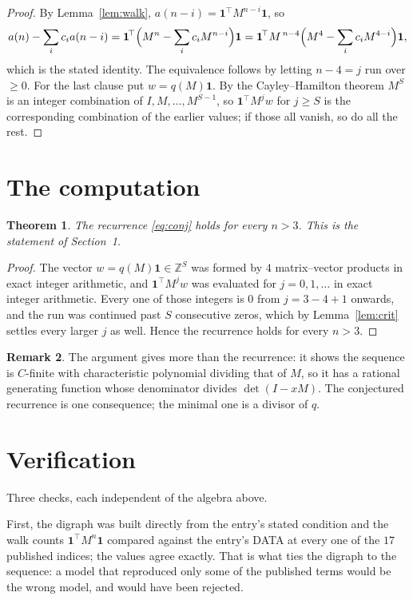\documentclass[11pt,a4paper]{article}
\theoremstyle{plain}
\newtheorem{theorem}{Theorem}
\theoremstyle{definition}
\newtheorem{remark}[theorem]{Remark}
\begin{document}
\begin{proof}
By Lemma~\ref{lem:walk}, $a(n-i)=\mathbf{1}^{\!\top}M^{n-i}\mathbf{1}$, so
\[
a(n)-\sum_i c_i a(n-i)
=\mathbf{1}^{\!\top}\Bigl(M^{n}-\sum_i c_i M^{n-i}\Bigr)\mathbf{1}
=\mathbf{1}^{\!\top}M^{\,n-4}\Bigl(M^{4}-\sum_i c_i M^{4-i}\Bigr)\mathbf{1},
\]
which is the stated identity. The equivalence follows by letting $n-4=j$ run over
$\ge0$. For the last clause put $w=q(M)\mathbf{1}$. By the Cayley--Hamilton theorem
$M^{S}$ is an integer combination of $I,M,\dots,M^{S-1}$, so
$\mathbf{1}^{\!\top}M^{j}w$ for $j\ge S$ is the corresponding combination of the
earlier values; if those all vanish, so do all the rest.
\end{proof}

\section{The computation}

\begin{theorem}
The recurrence \eqref{eq:conj} holds for every $n>3$. This is the statement of
Section~1.
\end{theorem}

\begin{proof}
The vector $w=q(M)\mathbf{1}\in\mathbb{Z}^{S}$ was formed by $4$ matrix--vector
products in exact integer arithmetic, and $\mathbf{1}^{\!\top}M^{j}w$ was evaluated for
$j=0,1,\dots$ in exact integer arithmetic. Every one of those integers is $0$ from
$j=3-4+1$ onwards, and the run was continued past $S$ consecutive zeros, which by
Lemma~\ref{lem:crit} settles every larger $j$ as well. Hence the recurrence holds for
every $n>3$.
\end{proof}

\begin{remark}
The argument gives more than the recurrence: it shows the sequence is $C$-finite with
characteristic polynomial dividing that of $M$, so it has a rational generating function
whose denominator divides $\det(I-xM)$. The conjectured recurrence is one consequence; the
minimal one is a divisor of $q$.
\end{remark}

\section{Verification}

Three checks, each independent of the algebra above.

First, the digraph was built directly from the entry's stated condition and the walk counts
$\mathbf{1}^{\!\top}M^{n}\mathbf{1}$ compared against the entry's DATA at every one of
the $17$ published indices; the values agree exactly. That is what ties the digraph to
the sequence: a model that reproduced only some of the published terms would be the wrong
model, and would have been rejected.
\end{document}
